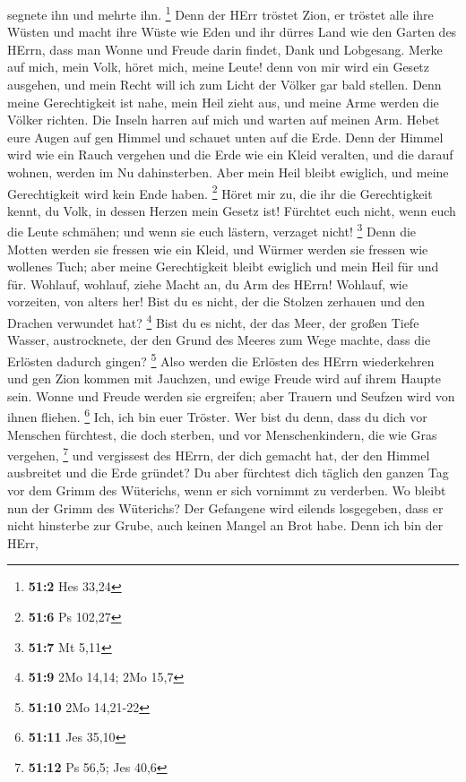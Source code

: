 segnete ihn und mehrte ihn. \footnote{\textbf{51:2} Hes 33,24}
 Denn der HErr tröstet Zion, er tröstet alle ihre Wüsten und
macht ihre Wüste wie Eden und ihr dürres Land wie den Garten des HErrn,
dass man Wonne und Freude darin findet, Dank und Lobgesang. 
Merke auf mich, mein Volk, höret mich, meine Leute! denn von mir wird
ein Gesetz ausgehen, und mein Recht will ich zum Licht der Völker gar
bald stellen.  Denn meine Gerechtigkeit ist nahe, mein Heil
zieht aus, und meine Arme werden die Völker richten. Die Inseln harren
auf mich und warten auf meinen Arm.  Hebet eure Augen auf
gen Himmel und schauet unten auf die Erde. Denn der Himmel wird wie ein
Rauch vergehen und die Erde wie ein Kleid veralten, und die darauf
wohnen, werden im Nu dahinsterben. Aber mein Heil bleibt ewiglich, und
meine Gerechtigkeit wird kein Ende haben. \footnote{\textbf{51:6} Ps
  102,27}  Höret mir zu, die ihr die Gerechtigkeit kennt, du
Volk, in dessen Herzen mein Gesetz ist! Fürchtet euch nicht, wenn euch
die Leute schmähen; und wenn sie euch lästern, verzaget nicht!
\footnote{\textbf{51:7} Mt 5,11}  Denn die Motten werden sie
fressen wie ein Kleid, und Würmer werden sie fressen wie wollenes Tuch;
aber meine Gerechtigkeit bleibt ewiglich und mein Heil für und für.
 Wohlauf, wohlauf, ziehe Macht an, du Arm des HErrn!
Wohlauf, wie vorzeiten, von alters her! Bist du es nicht, der die
Stolzen zerhauen und den Drachen verwundet hat? \footnote{\textbf{51:9}
  2Mo 14,14; 2Mo 15,7}  Bist du es nicht, der das Meer, der
großen Tiefe Wasser, austrocknete, der den Grund des Meeres zum Wege
machte, dass die Erlösten dadurch gingen? \footnote{\textbf{51:10} 2Mo
  14,21-22}  Also werden die Erlösten des HErrn
wiederkehren und gen Zion kommen mit Jauchzen, und ewige Freude wird auf
ihrem Haupte sein. Wonne und Freude werden sie ergreifen; aber Trauern
und Seufzen wird von ihnen fliehen. \footnote{\textbf{51:11} Jes 35,10}
 Ich, ich bin euer Tröster. Wer bist du denn, dass du dich
vor Menschen fürchtest, die doch sterben, und vor Menschenkindern, die
wie Gras vergehen, \footnote{\textbf{51:12} Ps 56,5; Jes 40,6}
 und vergissest des HErrn, der dich gemacht hat, der den
Himmel ausbreitet und die Erde gründet? Du aber fürchtest dich täglich
den ganzen Tag vor dem Grimm des Wüterichs, wenn er sich vornimmt zu
verderben. Wo bleibt nun der Grimm des Wüterichs?  Der
Gefangene wird eilends losgegeben, dass er nicht hinsterbe zur Grube,
auch keinen Mangel an Brot habe.  Denn ich bin der HErr,
